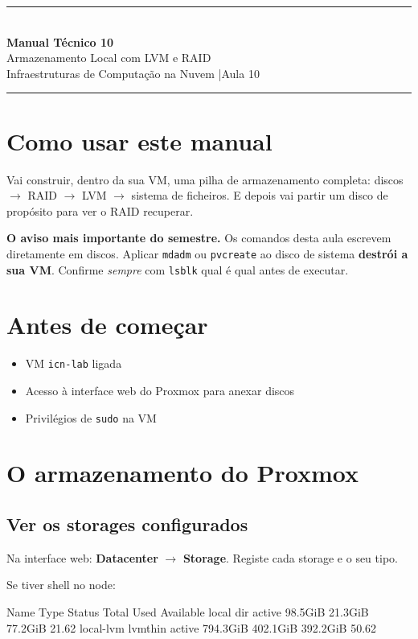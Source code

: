 \documentclass[11pt,a4paper]{article}
\newcommand{\manualtitle}[3]{%
  \thispagestyle{empty}
  \begin{center}
  {\color{NudeTaupe}\rule{\textwidth}{0.5pt}}\\[0.5cm]
  {\LARGE\bfseries\color{TextEspresso} Manual Técnico #1}\\[0.35cm]
  {\large\color{TextEspresso} #2}\\[0.3cm]
  {\normalsize\color{NudeTaupe} Infraestruturas de Computação na Nuvem \quad|\quad #3}\\[0.4cm]
  {\color{NudeTaupe}\rule{\textwidth}{0.5pt}}
  \end{center}
  \vspace{0.4cm}
}
\begin{document}
\manualtitle{10}{Armazenamento Local com LVM e RAID}{Aula 10}

\section*{Como usar este manual}

Vai construir, dentro da sua VM, uma pilha de armazenamento completa: discos $\rightarrow$ RAID $\rightarrow$ LVM $\rightarrow$ sistema de ficheiros. E depois vai partir um disco de propósito para ver o RAID recuperar.

\begin{atencao}
\textbf{O aviso mais importante do semestre.} Os comandos desta aula escrevem diretamente em discos. Aplicar \texttt{mdadm} ou \texttt{pvcreate} ao disco de sistema \textbf{destrói a sua VM}. Confirme \emph{sempre} com \texttt{lsblk} qual é qual antes de executar.
\end{atencao}

\section*{Antes de começar}

\begin{itemize}
  \item[$\square$] VM \texttt{icn-lab} ligada
  \item[$\square$] Acesso à interface web do Proxmox para anexar discos
  \item[$\square$] Privilégios de \texttt{sudo} na VM
\end{itemize}

\section{O armazenamento do Proxmox}

\subsection{Ver os storages configurados}

Na interface web: \textbf{Datacenter} $\rightarrow$ \textbf{Storage}. Registe cada storage e o seu tipo.

Se tiver shell no node:

\begin{saida}
Name             Type     Status     Total     Used  Available    %
local             dir     active   98.5GiB  21.3GiB    77.2GiB  21.62%
local-lvm     lvmthin     active  794.3GiB 402.1GiB   392.2GiB  50.62%
\end{saida}
\end{document}
